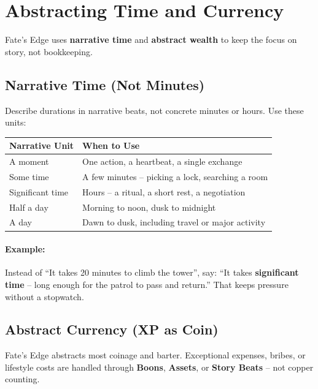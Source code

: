 \section{Abstracting Time and Currency}
\label{sec:abstraction}

Fate’s Edge uses \textbf{narrative time} and \textbf{abstract wealth} to keep the focus on story, not bookkeeping.

\subsection{Narrative Time (Not Minutes)}
\label{subsec:narrative-time}
Describe durations in narrative beats, not concrete minutes or hours. Use these units:

\begin{center}
\small
\begin{tabular}{ll}
\toprule
\textbf{Narrative Unit} & \textbf{When to Use} \\
\midrule
A moment & One action, a heartbeat, a single exchange \\
Some time & A few minutes – picking a lock, searching a room \\
Significant time & Hours – a ritual, a short rest, a negotiation \\
Half a day & Morning to noon, dusk to midnight \\
A day & Dawn to dusk, including travel or major activity \\
\bottomrule
\end{tabular}
\end{center}

\paragraph{Example:}
Instead of “It takes 20 minutes to climb the tower”, say: “It takes \textbf{significant time} – long enough for the patrol to pass and return.” That keeps pressure without a stopwatch.

\subsection{Abstract Currency (XP as Coin)}
\label{subsec:xp-as-coin}
Fate’s Edge abstracts most coinage and barter. Exceptional expenses, bribes, or lifestyle costs are handled through \textbf{Boons}, \textbf{Assets}, or \textbf{Story Beats} – not copper counting.

